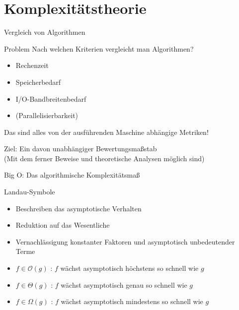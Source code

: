 \section{Komplexitätstheorie}

\begin{frame}{Vergleich von Algorithmen}
	\begin{block}{Problem}
		Nach welchen Kriterien vergleicht man Algorithmen?
	\end{block}

	\pause

	\begin{itemize}
		\item Rechenzeit
		\item Speicherbedarf
		\item I/O-Bandbreitenbedarf
		\item (Parallelisierbarkeit)
	\end{itemize}

	\pause
	
	Das sind alles von der ausführenden Maschine abhängige Metriken!
	
	Ziel: Ein davon unabhängiger Bewertungsmaßstab \\
	\footnotesize{(Mit dem ferner Beweise und theoretische Analysen möglich sind)}
\end{frame}

\begin{frame}{Big O: Das algorithmische Komplexitätsmaß}
	\begin{block}{Landau-Symbole}
		\begin{itemize}
			\item Beschreiben das asymptotische Verhalten 
			\item Reduktion auf das Wesentliche
			\item Vernachlässigung konstanter Faktoren und asymptotisch unbedeutender Terme
		\end{itemize}
		
		\pause
		
		\begin{itemize}
			\item $f \in \mathcal{O}(g)$ : $f$ wächst asymptotisch höchstens so schnell wie $g$
			\item $f \in \Theta(g)$ : $f$ wächst asymptotisch genau so schnell wie $g$
			\item $f \in \Omega(g)$ : $f$ wächst asymptotisch mindestens so schnell wie $g$
		\end{itemize}
	\end{block}
\end{frame}

